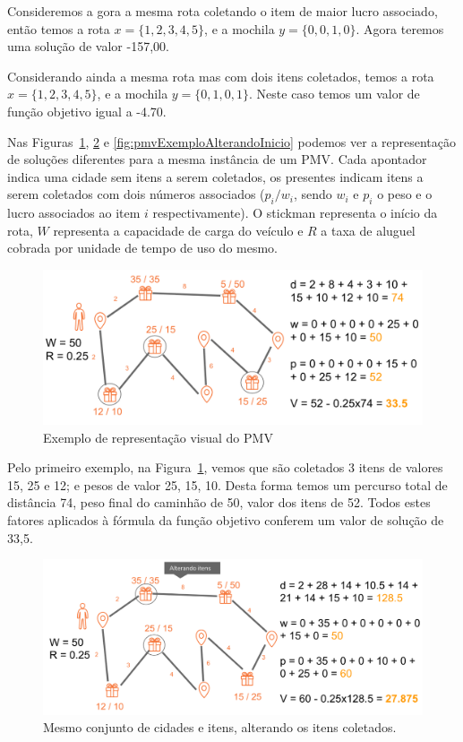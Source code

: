 Consideremos a gora a mesma rota coletando o item de maior lucro associado, então temos a rota $x = \{ 1, 2, 3, 4, 5 \}$, e a mochila $y = \{ 0, 0, 1, 0 \}$.
Agora teremos uma solução de valor -157,00.

Considerando ainda a mesma rota mas com dois itens coletados, temos a rota $x = \{ 1, 2, 3, 4, 5 \}$, e a mochila $y = \{ 0, 1, 0, 1 \}$.
Neste caso temos um valor de função objetivo igual a -4.70.


Nas Figuras~\ref{fig:pmvExemplo}, \ref{fig:pmvExemploAlterandoItens} e \ref{fig:pmvExemploAlterandoInicio} podemos ver a representação de soluções diferentes para a mesma instância de um PMV.
Cada apontador indica uma cidade sem itens a serem coletados, os presentes indicam itens a serem coletados com dois números associados ($p_i / w_i$, sendo $w_i$ e $p_i$ o peso e o lucro associados ao item $i$ respectivamente).
O stickman representa o início da rota, $W$ representa a capacidade de carga do veículo e $R$ a taxa de aluguel cobrada por unidade de tempo de uso do mesmo.

\begin{figure}[htpb]
    \centering
    \includegraphics[width=0.8\linewidth]{figuras/pmv/example01.png}
    \caption{Exemplo de representação visual do PMV}
    \label{fig:pmvExemplo}
\end{figure}

Pelo primeiro exemplo, na Figura~\ref{fig:pmvExemplo}, vemos que são coletados 3 itens de valores 15, 25 e 12; e pesos de valor 25, 15, 10.
Desta forma temos um percurso total de distância 74, peso final do caminhão de 50, valor dos itens de 52.
Todos estes fatores aplicados à fórmula da função objetivo conferem um valor de solução de 33,5.

\begin{figure}[htpb]
    \centering
    \includegraphics[width=0.8\linewidth]{figuras/pmv/example02.png}
    \caption{Mesmo conjunto de cidades e itens, alterando os itens coletados.}
    \label{fig:pmvExemploAlterandoItens}
\end{figure}

